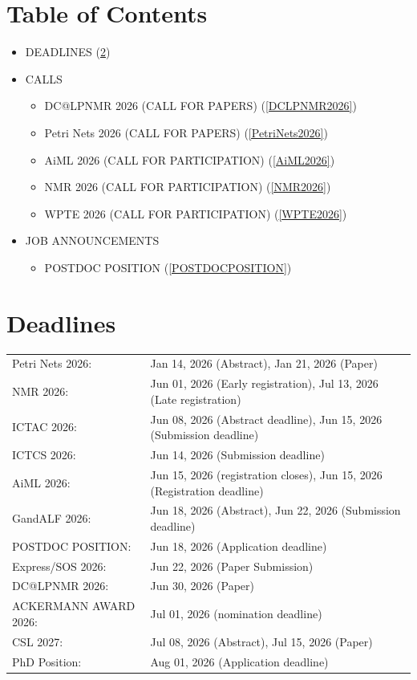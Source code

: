 \documentclass[prodmode,acmtecs]{acmsmall} %
\begin{document}
\section{Table of Contents}\begin{itemize}\item DEADLINES (\cref{deadlines}) 
 
\item CALLS 
 
\begin{itemize}\item DC@LPNMR 2026 (CALL FOR PAPERS) (\cref{DCLPNMR2026})
\item Petri Nets 2026 (CALL FOR PAPERS) (\cref{PetriNets2026})
\item AiML 2026 (CALL FOR PARTICIPATION) (\cref{AiML2026})
\item NMR 2026 (CALL FOR PARTICIPATION) (\cref{NMR2026})
\item WPTE 2026 (CALL FOR PARTICIPATION) (\cref{WPTE2026})
\end{itemize} 
\item JOB ANNOUNCEMENTS 
 
\begin{itemize}\item POSTDOC POSITION (\cref{POSTDOCPOSITION})
\end{itemize} 
\end{itemize}\section{Deadlines}\label{deadlines}\begin{tabulary}{\linewidth}{LL}Petri Nets 2026:  & Jan 14, 2026 (Abstract), Jan 21, 2026 (Paper) \\
NMR 2026:  & Jun 01, 2026 (Early registration), Jul 13, 2026 (Late registration) \\
ICTAC 2026:  & Jun 08, 2026 (Abstract deadline), Jun 15, 2026 (Submission deadline) \\
ICTCS 2026:  & Jun 14, 2026 (Submission deadline) \\
AiML 2026:  & Jun 15, 2026 (registration closes), Jun 15, 2026 (Registration deadline) \\
GandALF 2026:  & Jun 18, 2026 (Abstract), Jun 22, 2026 (Submission deadline) \\
POSTDOC POSITION:  & Jun 18, 2026 (Application deadline) \\
Express/SOS 2026:  & Jun 22, 2026 (Paper Submission) \\
DC@LPNMR 2026:  & Jun 30, 2026 (Paper) \\
ACKERMANN AWARD 2026:  & Jul 01, 2026 (nomination deadline) \\
CSL 2027:  & Jul 08, 2026 (Abstract), Jul 15, 2026 (Paper) \\
PhD Position:  & Aug 01, 2026 (Application deadline) \\
\end{tabulary}
\end{document}

